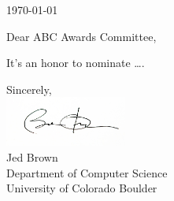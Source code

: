 \documentclass[onecolumn,oneside,12pt]{article}
\begin{document}
\today

Dear ABC Awards Committee,

It's an honor to nominate \ldots.

\vspace{1cm}
Sincerely, \\
\smallskip
\includegraphics[width=0.3\textwidth]{signature.jpg} \\
Jed Brown \\
Department of Computer Science \\
University of Colorado Boulder
\end{document}
